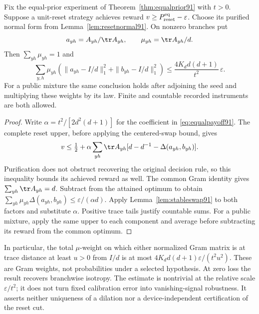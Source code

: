 \begin{corollary}\label{cor:resetstability91}
Fix the equal-prior experiment of Theorem~\ref{thm:equalprior91}
with $t>0$.  Suppose a unit-reset strategy achieves reward
$v\ge P_{\rm reset}^{\rm eq}-\varepsilon$.
Choose its purified normal form from Lemma~\ref{lem:resetnormal91}.
On nonzero branches put
\[
 a_{yh}=A_{yh}/\tr A_{yh},\qquad
 \mu_{yh}=\tr A_{yh}/d.
\]
Then $\sum_{yh}\mu_{yh}=1$ and
\begin{equation}\label{eq:resetstability91}
 \sum_{y,h}\mu_{yh}
 \left(\|a_{yh}-I/d\|_1^2+\|b_{yh}-I/d\|_1^2\right)
 \le \frac{4K_d d(d+1)}{t^2}\,\varepsilon.
\end{equation}
For a public mixture the same conclusion holds after adjoining the
seed and multiplying these weights by its law.  Finite and countable
recorded instruments are both allowed.
\end{corollary}
\begin{proof}
Write $\alpha=t^2/[2d^2(d+1)]$ for the coefficient in
\eqref{eq:equalpayoff91}.  The complete reset upper, before applying
the centered-swap bound, gives
\[
 v\le\tfrac12+\alpha\sum_{yh}\tr A_{yh}
          [d-d^{-1}-\Delta(a_{yh},b_{yh})].
\]
Purification does not obstruct recovering the original decision rule,
so this inequality bounds its achieved reward as well.  The common
Gram identity gives $\sum_{yh}\tr A_{yh}=d$.  Subtract from the
attained optimum to obtain
$\sum_{yh}\mu_{yh}\Delta(a_{yh},b_{yh})
\le\varepsilon/(\alpha d)$.
Apply Lemma~\ref{lem:stableswap91} to both factors and substitute
$\alpha$.  Positive trace tails justify countable sums.  For a public
mixture, apply the same upper to each component and average before
subtracting its reward from the common optimum.
\end{proof}
In particular, the total $\mu$-weight on which either normalized Gram
matrix is at trace distance at least $u>0$ from $I/d$ is at most
$4K_d d(d+1)\varepsilon/(t^2u^2)$.  These are Gram weights, not
probabilities under a selected hypothesis.  At zero loss the result
recovers branchwise isotropy.  The estimate is nontrivial at the
relative scale $\varepsilon/t^2$; it does not turn fixed calibration
error into vanishing-signal robustness.  It asserts neither uniqueness
of a dilation nor a device-independent certification of the reset cut.
